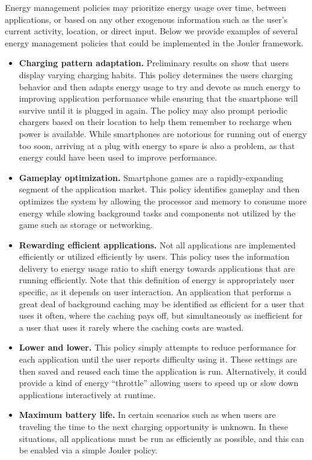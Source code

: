 Energy management policies may prioritize energy usage over time, between
applications, or based on any other exogenous information such as the user's
current activity, location, or direct input. Below we provide examples of
several energy management policies that could be implemented in the Jouler
framework.

\begin{itemize}

\item \textbf{Charging pattern adaptation.} Preliminary results on
\PhoneLab{} show that users display varying charging habits. This policy
determines the users charging behavior and then adapts energy usage to try
and devote as much energy to improving application performance while ensuring
that the smartphone will survive until it is plugged in again. The policy may
also prompt periodic chargers based on their location to help them remember
to recharge when power is available. While smartphones are notorious for
running out of energy too soon, arriving at a plug with energy to spare is
also a problem, as that energy could have been used to improve performance.

\item \textbf{Gameplay optimization.} Smartphone games are a
rapidly-expanding segment of the application market. This policy identifies
gameplay and then optimizes the system by allowing the processor and memory
to consume more energy while slowing background tasks and components not
utilized by the game such as storage or networking.

\item \textbf{Rewarding efficient applications.} Not all applications are
implemented efficiently or utilized efficiently by users. This policy uses
the information delivery to energy usage ratio to shift energy towards
applications that are running efficiently. Note that this definition of
energy is appropriately user specific, as it depends on user interaction. An
application that performs a great deal of background caching may be
identified as efficient for a user that uses it often, where the caching pays
off, but simultaneously as inefficient for a user that uses it rarely where
the caching costs are wasted.

\item \textbf{Lower and lower.} This policy simply attempts to reduce
performance for each application until the user reports difficulty using it.
These settings are then saved and reused each time the application is run.
Alternatively, it could provide a kind of energy ``throttle'' allowing users
to speed up or slow down applications interactively at runtime.

\item \textbf{Maximum battery life.} In certain scenarios such as when users
are traveling the time to the next charging opportunity is unknown. In these
situations, all applications must be run as efficiently as possible, and this
can be enabled via a simple Jouler policy.

\end{itemize}

